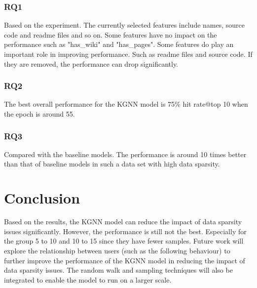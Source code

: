 \documentclass[11pt,twoside]{report}
\begin{document}
\subsection{RQ1}
Based on the experiment. The currently selected features include names, source code and readme files and so on. Some features have no impact on the performance such as "has\_wiki" and "has\_pages". Some features do play an important role in improving performance. Such as readme files and source code. If they are removed, the performance can drop significantly.

\subsection{RQ2}
The best overall performance for the KGNN model is 75\% hit rate@top 10 when the epoch is around 55.

\subsection{RQ3}
Compared with the baseline models. The performance is around 10 times better than that of baseline models in such a data set with high data sparsity.

\chapter{Conclusion}
Based on the results, the KGNN model can reduce the impact of data sparsity issues significantly. However, the performance is still not the best. Especially for the group 5 to 10 and 10 to 15 since they have fewer samples. Future work will explore the relationship between users (such as the following behaviour) to further improve the performance of the KGNN model in reducing the impact of data sparsity issues. The random walk and sampling techniques will also be integrated to enable the model to run on a larger scale.




\end{document}
